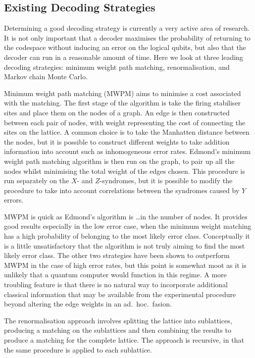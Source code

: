 \subsection{Existing Decoding Strategies}

Determining a good decoding strategy is currently a very active area of research. It is not only important that a decoder maximises the probability of returning to the codespace without inducing an error on the logical qubits, but also that the decoder can run in a reasonable amount of time. Here we look at three leading decoding strategies: minimum weight path matching, renormalisation, and Markov chain Monte Carlo.

Minimum weight path matching (MWPM) aims to minimise a cost associated with the matching. The first stage of the algorithm is take the firing stabiliser sites and place them on the nodes of a graph. An edge is then constructed between each pair of nodes, with weight representing the cost of connecting the sites on the lattice. A common choice is to take the Manhatten distance between the nodes, but it is possible to construct different weights to take addition information into account such as inhomogeneous error rates. Edmond's minimum weight path matching algorithm is then run on the graph, to pair up all the nodes whilst minimising the total weight of the edges chosen. This procedure is run separately on the $X$- and $Z$-syndromes, but it is possible to modify the procedure to take into account correlations between the syndromes caused by $Y$ errors.

MWPM is quick as Edmond's algorithm is \ldots in the number of nodes. It provides good results especially in the low error case, when the minimum weight matching has a high probability of belonging to the most likely error class. Conceptually it is a little unsatisfactory that the algorithm is not truly aiming to find the most likely error class. The other two strategies have been shown to outperform MWPM in the case of high error rates, but this point is somewhat moot as it is unlikely that a quantum computer would function in this regime. A more troubling feature is that there is no natural way to incorporate additional classical information that may be available from the experimental procedure beyond altering the edge weights in an ad.\ hoc.\ fasion.

The renormalisation approach involves splitting the lattice into sublattices, producing a matching on the sublattices and then combining the results to produce a matching for the complete lattice. The approach is recursive, in that the same procedure is applied to each sublattice. 

